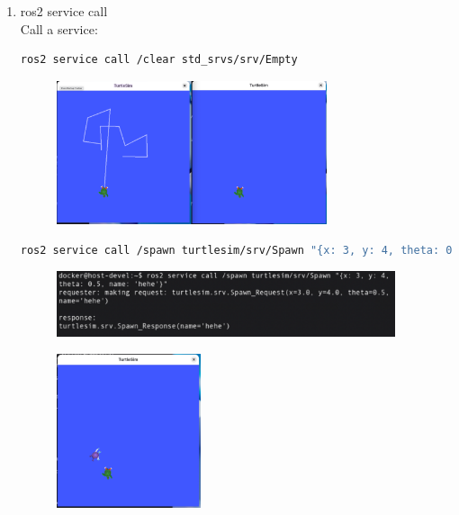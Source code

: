 \documentclass[12pt, a4paper]{article}
\begin{document}
\begin{enumerate}
\newpage
\item ros2 service call\\
Call a service:
\begin{lstlisting}[language=bash]
ros2 service call /clear std_srvs/srv/Empty
\end{lstlisting}
\begin{figure}[h]
	\centering
	\includegraphics[width=0.75\textwidth]{p1.5-6}
\end{figure}

\begin{lstlisting}[language=bash]
ros2 service call /spawn turtlesim/srv/Spawn "{x: 3, y: 4, theta: 0.5, name: 'hehe'}"
\end{lstlisting}
\begin{figure}[h]
	\setlength{\leftskip}{2.4em}
	\includegraphics[width=0.94\textwidth]{p1.5-7}
\end{figure}
\begin{figure}[h]
	\centering
	\includegraphics[width=0.4\textwidth]{p1.5-8}
\end{figure}
\end{enumerate}

\newpage
\end{document}
